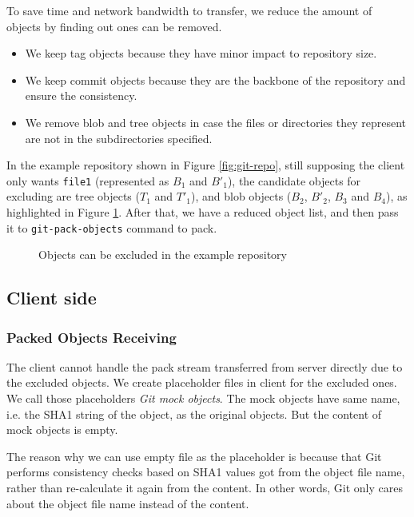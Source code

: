 \documentclass[preprint]{sigplanconf}
\begin{document}
To save time and network bandwidth to transfer, we reduce the amount of objects
by finding out ones can be removed.
\begin{itemize}
  \item We keep tag objects because they have minor impact to repository size.

  \item We keep commit objects because they are the backbone of the repository
    and ensure the consistency.

  \item We remove blob and tree objects in case the files or directories they
    represent are not in the subdirectories specified.

\end{itemize}

In the example repository shown in Figure \ref{fig:git-repo}, still supposing
the client only wants \verb|file1| (represented as $B_1$ and $B'_1$), the
candidate objects for excluding are tree objects ($T_1$ and $T'_1$), and blob
objects ($B_2$, $B'_2$, $B_3$ and $B_4$), as highlighted in Figure
\ref{fig:find-obj-to-remove}.
After that, we have a reduced object list, and then pass it to
\verb|git-pack-objects| command to pack.
\begin{figure}[htpb]
  \centering
  
  \caption{Objects can be excluded in the example repository}
  \label{fig:find-obj-to-remove}
\end{figure}


\subsection{Client side}
\subsubsection{Packed Objects Receiving}
The client cannot handle the pack stream transferred from server directly
due to the excluded objects.
We create placeholder files in client for the excluded ones.
We call those placeholders \emph{Git mock objects}.
The mock objects have same name, i.e. the SHA1 string of the object, as the
original objects.
But the content of mock objects is empty.

The reason why we can use empty file as the placeholder is because that Git
performs consistency checks based on SHA1 values got from the object file name,
rather than re-calculate it again from the content.
In other words, Git only cares about the object file name instead of the
content.
\end{document}
